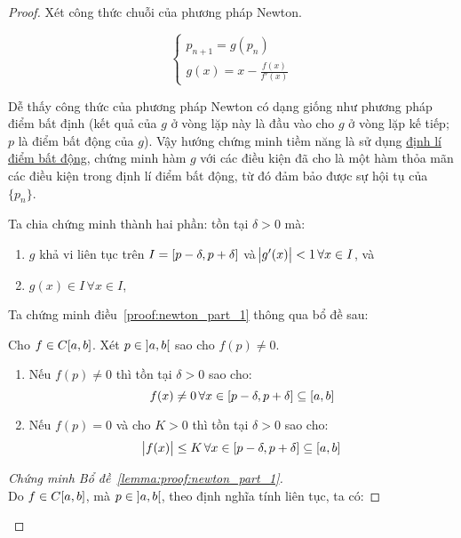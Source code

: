 \documentclass[../../Lectures]{subfiles}
\begin{document}
\begin{proof}
    Xét công thức chuỗi của phương pháp Newton.

    \[\begin{cases}
        p_{n + 1} = g(p_n) \\
        g(x) = x - \frac{f(x)}{f'(x)}
    \end{cases}\]

    Dễ thấy công thức của phương pháp Newton có dạng giống như phương pháp điểm
    bất định (kết quả của \(g\) ở vòng lặp này là đầu vào cho \(g\) ở vòng lặp
    kế tiếp; \(p\) là điểm bất động của \(g\)). Vậy hướng chứng minh tiềm năng
    là sử dụng \hyperref[thm:fixed_point]{định lí điểm bất động}, chứng minh hàm
    \(g\) với các điều kiện đã cho là một hàm thỏa mãn các điều kiện trong định
    lí điểm bất động, từ đó đảm bảo được sự hội tụ của \(\{p_n\}\).

    Ta chia chứng minh thành hai phần: tồn tại \(\delta > 0\) mà:

    \begin{enumerate}
        \item \label{proof:newton_part_1} \(g\) khả vi liên tục trên \(I =
            \interval{p - \delta}{p + \delta}\) và \(\abs{g'(x)} < 1 \, \forall
            x \in I\), và
        \item \label{proof:newton_part_2} \(g(x) \in I \, \forall x \in I\),
    \end{enumerate}

    Ta chứng minh điều~\ref{proof:newton_part_1} thông qua bổ đề sau:

    \begin{lemma}\label{lemma:proof:newton_part_1}
        Cho \(f \in C \interval{a}{b}\). Xét \(p \in \interval[open]{a}{b}\) sao
        cho \(f(p) \neq 0\).

        \begin{enumerate}[label = (\alph*)]
            \item Nếu \(f(p) \neq 0\) thì tồn tại \(\delta > 0\) sao cho:
                \[f(x) \neq 0 \, \forall x \in \interval{p - \delta}{p + \delta} \subseteq \interval{a}{b}\]
            \item Nếu \(f(p) = 0\) và cho \(K > 0\) thì tồn tại \(\delta > 0\) sao cho:
                \[\abs{f(x)} \leq K \, \forall x \in \interval{p - \delta}{p + \delta} \subseteq \interval{a}{b}\]
        \end{enumerate}
    \end{lemma}

    \begin{proof}[Chứng minh Bổ đề~\ref{lemma:proof:newton_part_1}]
        $ $\\    %
        Do \(f \in C \interval{a}{b}\), mà \(p \in \interval[open]{a}{b}\), theo
        định nghĩa tính liên tục, ta có:


\end{proof}
\end{proof}
\end{document}
